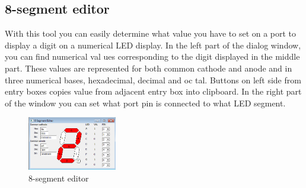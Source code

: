                 \subsection{8-segment editor}
                With this tool you can easily determine what
                value you have to set on a port to display a digit
                on a numerical LED display. In the left part of
                the dialog window, you can find numerical val
                ues corresponding to the digit displayed in the
                middle part. These values are represented for
                both common cathode and anode and in three
                numerical bases, hexadecimal, decimal and oc
                tal. Buttons on left side from entry boxes copies
                value from adjacent entry box into clipboard.
                In the right part of the window you can set what port pin is connected to
                what LED segment.
                        \begin{figure}
                            \centering{}
                            \includegraphics[width=110pt]{img/8segment.png}
                            \caption{8-segment editor}
                        \end{figure}
